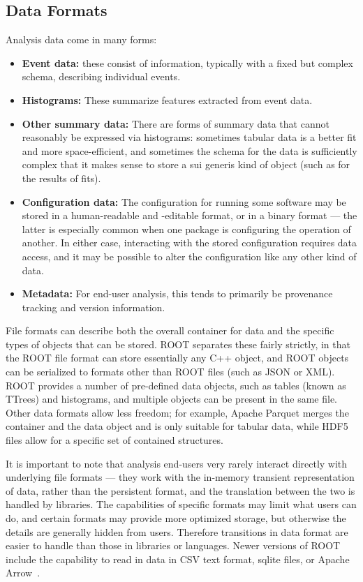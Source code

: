 \subsection{Data Formats}
Analysis data come in many forms:
\begin{itemize}
\item \textbf{Event data:} these consist of information, typically with a fixed but complex schema, describing individual events.
\item \textbf{Histograms:} These summarize features extracted from event data.
\item \textbf{Other summary data:} There are forms of summary data that cannot reasonably be expressed via histograms: sometimes tabular data is a better fit and more space-efficient, and sometimes the schema for the data is sufficiently complex that it makes sense to store a sui generis kind of object (such as for the results of fits).
\item \textbf{Configuration data:} The configuration for running some software may be stored in a human-readable and -editable format, or in a binary format --- the latter is especially common when one package is configuring the operation of another. In either case, interacting with the stored configuration requires data access, and it may be possible to alter the configuration like any other kind of data. 
\item \textbf{Metadata:} For end-user analysis, this tends to primarily be provenance tracking and version information.
\end{itemize}

File formats can describe both the overall container for data and the specific types of objects that can be stored. ROOT separates these fairly strictly, in that the ROOT file format can store essentially any C++ object, and ROOT objects can be serialized to formats other than ROOT files (such as JSON or XML). ROOT provides a number of pre-defined data objects, such as tables (known as TTrees) and histograms, and multiple objects can be present in the same file. Other data formats allow less freedom; for example, Apache Parquet merges the container and the data object and is only suitable for tabular data, while HDF5 files allow for a specific set of contained structures.

It is important to note that analysis end-users very rarely interact directly with underlying file formats --- they work with the in-memory transient representation of data, rather than the persistent format, and the translation between the two is handled by libraries. The capabilities of specific formats may limit what users can do, and certain formats may provide more optimized storage, but otherwise the details are generally hidden from users. Therefore transitions in data format are easier to handle than those in libraries or languages. Newer versions of ROOT include the capability to read in data in CSV text format, sqlite files, or Apache Arrow~\cite{Arrow}.


